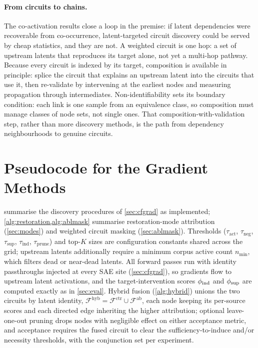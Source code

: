 \documentclass[10pt]{article}
\begin{document}
\paragraph{From circuits to chains.}
The co-activation results close a loop in the premise: if latent dependencies were recoverable from co-occurrence, latent-targeted circuit discovery could be served by cheap statistics, and they are not.
A weighted circuit is one hop: a set of upstream latents that reproduces its target alone, not yet a multi-hop pathway.
Because every circuit is indexed by its target, composition is available in principle: splice the circuit that explains an upstream latent into the circuits that use it, then re-validate by intervening at the earliest nodes and measuring propagation through intermediates.
Non-identifiability sets its boundary condition: each link is one sample from an equivalence class, so composition must manage classes of node sets, not single ones.
That composition-with-validation step, rather than more discovery methods, is the path from dependency neighbourhoods to genuine circuits.

\section{Pseudocode for the Gradient Methods}
\label{app:pseudocode}

 summarise the discovery procedures of \cref{sec:cfgrad} as implemented; \cref{alg:restoration,alg:ablmask} summarise restoration-mode attribution (\cref{sec:modes}) and weighted circuit masking (\cref{sec:ablmask}).
Thresholds ($\tau_{\mathrm{act}}$, $\tau_{\mathrm{neg}}$, $\tau_{\mathrm{sup}}$, $\tau_{\mathrm{ind}}$, $\tau_{\mathrm{prune}}$) and top-$K$ sizes are configuration constants shared across the grid; upstream latents additionally require a minimum corpus active count $n_{\min}$, which filters dead or near-dead latents.
All forward passes run with identity passthroughs injected at every SAE site (\cref{sec:cfgrad}), so gradients flow to upstream latent activations, and the target-intervention scores $\phi_{\mathrm{ind}}$ and $\phi_{\mathrm{sup}}$ are computed exactly as in \cref{sec:eval}.
Hybrid fusion (\cref{alg:hybrid}) unions the two circuits by latent identity, $\mathcal{F}^{\mathrm{hyb}} = \mathcal{F}^{\mathrm{ctr}} \cup \mathcal{F}^{\mathrm{ab}}$, each node keeping its per-source scores and each directed edge inheriting the higher attribution; optional leave-one-out pruning drops nodes with negligible effect on either acceptance metric, and acceptance requires the fused circuit to clear the sufficiency-to-induce and/or necessity thresholds, with the conjunction set per experiment.
\end{document}

